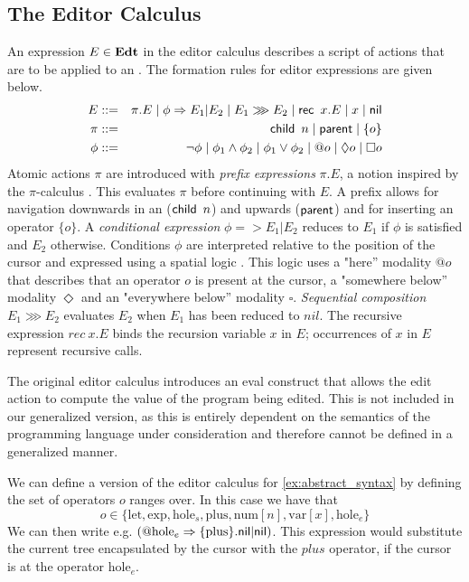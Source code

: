 \documentclass[sigplan,screen]{acmart}
\begin{document}
\subsection{The Editor Calculus}
An expression $E \in \textbf{Edt}$ in the editor calculus describes a script
of actions that are to be applied to an \abt. The formation rules for
editor expressions are given below.
%
\begin{align*}
  E & ::= & \pi.E  \mid  \phi => E_1|E_2  \mid  E_1 \ggg E_2  \mid  \textsf{rec}\,  \ x.E  \mid  x  \mid  \textsf{nil}  \\
    \pi & ::= & \textsf{child}\,  \ n  \mid  \textsf{parent}   \mid  \{o\} \\
    \phi & ::= & \neg\phi  \mid  \phi_1 \wedge \phi_2  \mid  \phi_1 \vee \phi_2  \mid  @o  \mid  \Diamond o  \mid  \square o
\end{align*}
%
Atomic actions $\pi$ are introduced with \emph{prefix expressions}
$\pi.E$, a notion inspired by the $\pi$-calculus
\cite{picalculus}. This evaluates $\pi$ before continuing with $E$. A
prefix allows for navigation downwards in an \abt ($\textsf{child}\, \ n$) and
upwards ($\textsf{parent}$) and for inserting an operator $\{ o \}$. A
\emph{conditional expression} $\phi => E_1|E_2$ reduces to $E_1$ if
$\phi$ is satisfied and $E_2$ otherwise. Conditions $\phi$ are
interpreted relative to the position of the cursor and expressed using
a spatial logic \cite{CAIRES2003194}. This logic uses a "here''
modality $@o$ that describes that an operator $o$ is present at the
cursor, a "somewhere below'' modality $\Diamond$ and an "everywhere
below'' modality $\square$. \emph{Sequential composition}
$E_1 \ggg E_2$ evaluates $E_2$ when $E_1$ has been reduced to
$nil$. The recursive expression $rec \ x.E$ binds the recursion
variable $x$ in $E$; occurrences of $x$ in $E$ represent recursive
calls.

The original editor calculus \cite{type_safe_structure_editor}
introduces an \textsf{eval} construct that allows the edit action to
compute the value of the program being edited. This is not included in
our generalized version, as this is entirely dependent on the
semantics of the programming language under consideration and
therefore cannot be defined in a generalized manner.

\begin{example}\label{ex:editor_calculus}
    We can define a version of the editor calculus for
    \cref{ex:abstract_syntax} by defining the set of operators $o$ ranges over. In this case we have that
    \begin{equation*}
        o \in \{ \text{let}, \text{exp}, \text{hole}_s, \text{plus}, \text{num}[n], \text{var}[x], \text{hole}_e \}
    \end{equation*}
    We can then write e.g. $(@\text{hole}_e =>
    \{\text{plus}\}.\textsf{nil} |\textsf{nil} )$. This expression would
    substitute the current tree encapsulated by the cursor with the
    $plus$ operator, if the cursor is at the operator
    $\text{hole}_e$.
\end{example}
\end{document}
